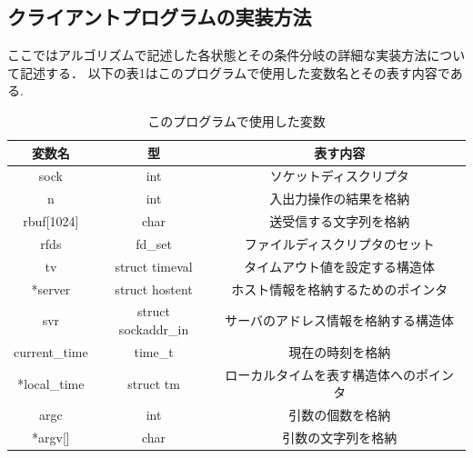 \documentclass[dvipdfmx]{jarticle}
\begin{document}
\subsection{クライアントプログラムの実装方法}
ここではアルゴリズムで記述した各状態とその条件分岐の詳細な実装方法について記述する．
以下の表1はこのプログラムで使用した変数名とその表す内容である.
\begin{table}[h]
    \centering
    \begin{tabular}{|c|c|c|}
        \hline
        変数名 & 型 & 表す内容\\\hline\hline
        sock & int & ソケットディスクリプタ\\\hline
        n & int & 入出力操作の結果を格納\\\hline
        rbuf[1024] & char & 送受信する文字列を格納\\\hline
        rfds & fd\_set & ファイルディスクリプタのセット\\\hline
        tv & struct timeval & タイムアウト値を設定する構造体\\\hline
        *server & struct hostent & ホスト情報を格納するためのポインタ\\\hline
        svr & struct sockaddr\_in & サーバのアドレス情報を格納する構造体\\\hline
        current\_time & time\_t & 現在の時刻を格納\\\hline
        *local\_time & struct tm & ローカルタイムを表す構造体へのポインタ\\\hline
        argc & int & 引数の個数を格納\\\hline
        *argv[] & char & 引数の文字列を格納\\\hline
    \end{tabular}
    \caption{このプログラムで使用した変数}
\end{table}
\end{document}

